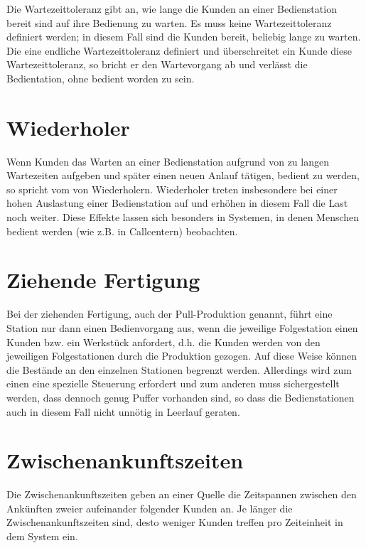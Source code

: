 Die Wartezeittoleranz gibt an, wie lange die Kunden an einer Bedienstation
bereit sind auf ihre Bedienung zu warten. Es muss keine Wartezeittoleranz definiert werden; in diesem
Fall sind die Kunden bereit, beliebig lange zu warten. Die eine endliche Wartezeittoleranz definiert und überschreitet
ein Kunde diese Wartezeittoleranz, so bricht er den Wartevorgang ab und verlässt die Bedientation, ohne bedient
worden zu sein.

\section*{Wiederholer}


Wenn Kunden das Warten an einer Bedienstation aufgrund von
zu langen Wartezeiten aufgeben und später einen neuen Anlauf tätigen, bedient zu werden,
so spricht vom von Wiederholern. Wiederholer treten insbesondere bei einer hohen Auslastung einer
Bedienstation auf und erhöhen in diesem Fall die Last noch weiter. Diese Effekte lassen sich besonders
in Systemen, in denen Menschen bedient werden (wie z.B. in Callcentern) beobachten.

\section*{Ziehende Fertigung}


Bei der ziehenden Fertigung, auch der Pull-Produktion genannt, führt eine Station nur dann einen Bedienvorgang aus, wenn die
jeweilige Folgestation einen Kunden bzw. ein Werkstück anfordert, d.h. die Kunden werden von den jeweiligen
Folgestationen durch die Produktion gezogen. Auf diese Weise können die Bestände an den einzelnen
Stationen begrenzt werden. Allerdings wird zum einen eine spezielle Steuerung erfordert und zum
anderen muss sichergestellt werden, dass dennoch genug Puffer vorhanden sind, so dass die Bedienstationen
auch in diesem Fall nicht unnötig in Leerlauf geraten.

\section*{Zwischenankunftszeiten}


Die Zwischenankunftszeiten geben an einer Quelle
die Zeitspannen zwischen den Ankünften zweier aufeinander folgender Kunden an. Je länger die
Zwischenankunftszeiten sind, desto weniger Kunden treffen pro Zeiteinheit in dem System ein.